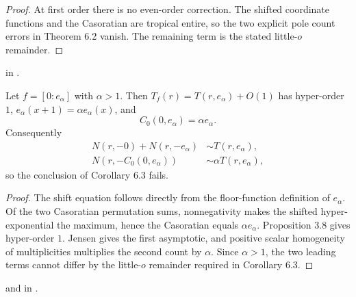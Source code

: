 \begin{proof}
\leanok
At first order there is no even-order correction.  The shifted coordinate
functions and the Casoratian are tropical entire, so the two explicit pole
count errors in Theorem 6.2 vanish.  The remaining term is the stated
little-$o$ remainder.
\end{proof}

\begin{leanproof}
 in
.
\end{leanproof}

\begin{example}
\leanok
{}
Let $f=[0:e_\alpha]$ with $\alpha>1$.  Then
$T_f(r)=T(r,e_\alpha)+O(1)$ has hyper-order $1$,
$e_\alpha(x+1)=\alpha e_\alpha(x)$, and
\[
 C_0(0,e_\alpha)=\alpha e_\alpha.
\]
Consequently
\begin{align*}
 N(r,-0)+N(r,-e_\alpha)&\sim T(r,e_\alpha),\\
 N(r,-C_0(0,e_\alpha))&\sim\alpha T(r,e_\alpha),
\end{align*}
so the conclusion of Corollary 6.3 fails.
\end{example}

\begin{proof}
\leanok
The shift equation follows directly from the floor-function definition of
$e_\alpha$.  Of the two Casoratian permutation sums, nonnegativity makes the
shifted hyper-exponential the maximum, hence the Casoratian equals
$\alpha e_\alpha$.  Proposition 3.8 gives hyper-order $1$.  Jensen gives the
first asymptotic, and positive scalar homogeneity of multiplicities multiplies
the second count by $\alpha$.  Since $\alpha>1$, the two leading terms cannot
differ by the little-$o$ remainder required in Corollary 6.3.
\end{proof}

\begin{leanproof}
and  in
.
\end{leanproof}
